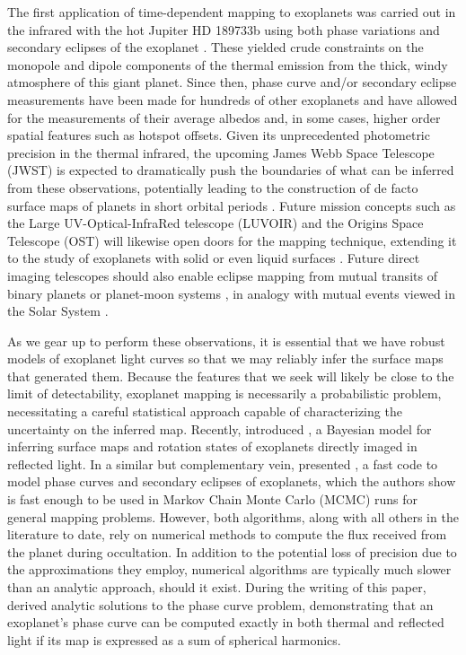 \documentclass[modern]{aastex61}
\begin{document}
The first application of time-dependent mapping to exoplanets was carried out in the
infrared with the hot Jupiter HD 189733b using both phase variations and
secondary eclipses of the exoplanet \citep{Knutson2007,Majeau2012,deWit2012}.
These yielded crude constraints on the monopole and dipole components of the thermal
emission from the thick, windy atmosphere of this giant planet.
%
Since then, phase curve and/or secondary eclipse measurements have been made for
hundreds of other exoplanets \citep[e.g.,][]{Shabram2016, Jansen2017, Adams2018} and have allowed for
the measurements of their average albedos and, in some cases, higher order spatial features
such as hotspot offsets. Given its unprecedented photometric precision in the thermal infrared,
the upcoming James Webb Space Telescope (JWST) is expected to dramatically push the boundaries of
what can be inferred from these observations, potentially leading to the construction of de facto
surface maps of planets in short orbital periods \citep{Beichman2014,Schlawin2018}.
%
Future mission concepts such as the Large UV-Optical-InfraRed telescope (LUVOIR) and the
Origins Space Telescope (OST) will likewise open doors for the mapping technique,
extending it to the study of exoplanets with solid or even liquid surfaces
\citep[e.g.,][]{KawaharaFujii2010,KawaharaFujii2011,FujiiKawahara2012,Cowan2012,CowanFuentesHaggard2013,CowanFujii2017,Fujii2017,LugerLustigYaegerAgol2017,BerdyuginaKuhn2017}.
Future direct imaging telescopes should also enable eclipse mapping from
mutual transits of binary planets or planet-moon systems \citep{Cabrera2007},
in analogy with mutual events viewed in the Solar System
\citep{Brinkmann1973,Vermilion1974,Herzog1975,Brinkmann1976,Reinsch1994,Young1999,
Young2001,Livengood2011}.

As we gear up to perform these observations, it is essential that we have
robust models of exoplanet light curves so
that we may reliably infer the surface maps that generated them. Because the
features that we seek will likely be close to the limit of detectability,
exoplanet mapping is necessarily a probabilistic problem, necessitating
a careful statistical approach capable of characterizing the uncertainty
on the inferred map. Recently, \citet{Farr2018} introduced \exocartographer,
a Bayesian model for inferring surface maps and rotation states
of exoplanets directly imaged in reflected light. In a similar but
complementary vein, \citet{Louden2018} presented \spiderman, a fast
code to model phase curves and secondary eclipses of exoplanets, which
the authors show is fast enough to be used in Markov Chain Monte Carlo
(MCMC) runs for general mapping problems. However, both algorithms, along with all
others in the literature to date, rely on numerical methods to compute
the flux received from the planet during occultation. In addition to
the potential loss of precision due to the approximations they employ,
numerical algorithms are typically much slower than an analytic
approach, should it exist. During the writing of this paper, \citet{Haggard2018} derived
analytic solutions to the phase curve problem, demonstrating that an
exoplanet's phase curve can be computed exactly in both thermal and
reflected light if its map is expressed as a sum of spherical harmonics.
\end{document}
